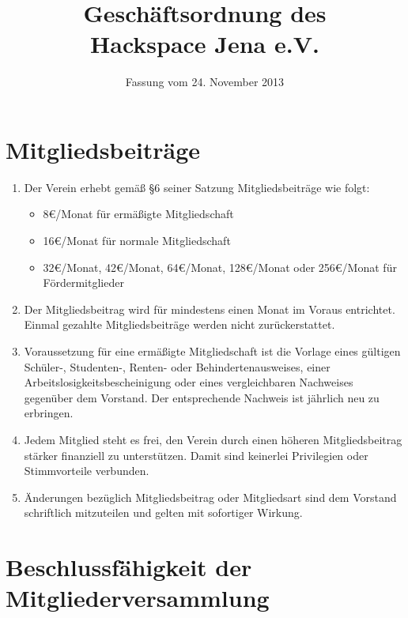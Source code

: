 \documentclass[fontsize=12pt,paper=a4,pagesize,headings=small]{scrartcl}
\title{Geschäftsordnung des \\ Hackspace Jena e.V.}
\date{Fassung vom 24. November 2013}
\begin{document}
\maketitle{}

\section{Mitgliedsbeiträge}

\begin{enumerate}
    \item Der Verein erhebt gemäß §6 seiner Satzung Mitgliedsbeiträge wie
        folgt:
        \begin{itemize}
            \item 8\euro{}/Monat für ermäßigte Mitgliedschaft
            \item 16\euro{}/Monat für normale Mitgliedschaft
            \item 32\euro{}/Monat, 42\euro{}/Monat, 64\euro{}/Monat,
                  128\euro{}/Monat oder 256\euro{}/Monat für
                  Fördermitglieder
        \end{itemize}

    \item Der Mitgliedsbeitrag wird für mindestens einen Monat im Voraus
        entrichtet. Einmal gezahlte Mitgliedsbeiträge werden nicht
        zurückerstattet.

    \item Voraussetzung für eine ermäßigte Mitgliedschaft ist die Vorlage
        eines gültigen Schüler-, Studenten-, Renten- oder
        Behindertenausweises, einer Arbeitslosigkeitsbescheinigung oder
        eines vergleichbaren Nachweises gegenüber dem Vorstand. Der
        entsprechende Nachweis ist jährlich neu zu erbringen.

    \item Jedem Mitglied steht es frei, den Verein durch einen höheren
        Mitgliedsbeitrag stärker finanziell zu unterstützen. Damit sind
        keinerlei Privilegien oder Stimmvorteile verbunden.

    \item Änderungen bezüglich Mitgliedsbeitrag oder Mitgliedsart sind dem
        Vorstand schriftlich mitzuteilen und gelten mit sofortiger Wirkung.
\end{enumerate}

\section{Beschlussfähigkeit der Mitgliederversammlung}
\end{document}
